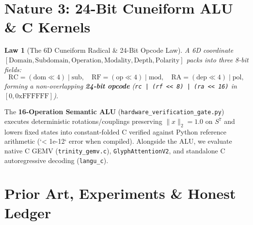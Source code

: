 \documentclass[10pt,twocolumn,letterpaper]{article}
\newtheorem{law}{Law}
\begin{document}
\section{Nature 3: 24-Bit Cuneiform ALU \& C Kernels}

\begin{law}[The 6D Cuneiform Radical & 24-Bit Opcode Law]
A 6D coordinate $[\text{Domain}, \text{Subdomain}, \text{Operation}, \text{Modality}, \text{Depth}, \text{Polarity}]$ packs into three 8-bit fields:
\begin{equation}
\text{RC} = (\text{dom} \ll 4) \mid \text{sub}, \quad \text{RF} = (\text{op} \ll 4) \mid \text{mod}, \quad \text{RA} = (\text{dep} \ll 4) \mid \text{pol},
\end{equation}
forming a non-overlapping \textbf{24-bit opcode} (\texttt{rc | (rf << 8) | (ra << 16)} in $[0, \text{0xFFFFFF}]$).
\end{law}

The \textbf{16-Operation Semantic ALU} (\texttt{hardware\_verification\_gate.py}) executes deterministic rotations/couplings preserving $\|x\|_2 = 1.0$ on $S^7$ and lowers fixed states into constant-folded C verified against Python reference arithmetic (`< 1e-12` error when compiled). Alongside the ALU, we evaluate native C GEMV (\texttt{trinity\_gemv.c}), \texttt{GlyphAttentionV2}, and standalone C autoregressive decoding (\texttt{langu\_c}).

\section{Prior Art, Experiments \& Honest Ledger}
\end{document}
